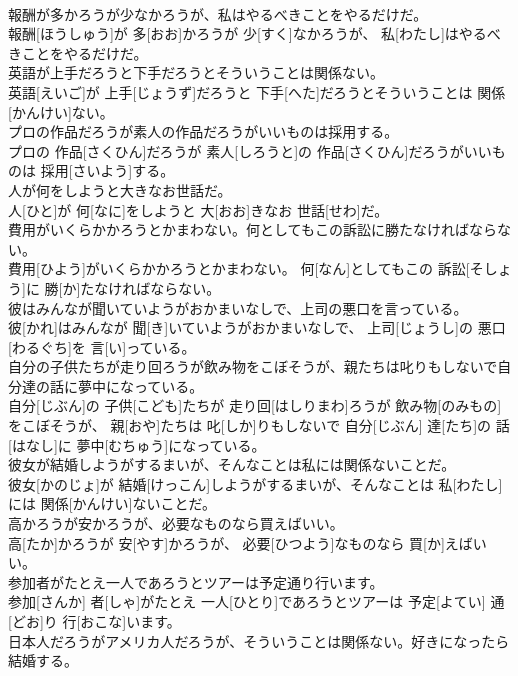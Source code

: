 \documentclass[8pt]{extreport}
\begin{document}
\begin{CJK}{UTF8}{min}
\\	報酬が多かろうが少なかろうが、私はやるべきことをやるだけだ。	
\\	報酬[ほうしゅう]が 多[おお]かろうが 少[すく]なかろうが、 私[わたし]はやるべきことをやるだけだ。
\\	英語が上手だろうと下手だろうとそういうことは関係ない。	
\\	英語[えいご]が 上手[じょうず]だろうと 下手[へた]だろうとそういうことは 関係[かんけい]ない。
\\	プロの作品だろうが素人の作品だろうがいいものは採用する。	
\\	プロの 作品[さくひん]だろうが 素人[しろうと]の 作品[さくひん]だろうがいいものは 採用[さいよう]する。
\\	人が何をしようと大きなお世話だ。	
\\	人[ひと]が 何[なに]をしようと 大[おお]きなお 世話[せわ]だ。
\\	費用がいくらかかろうとかまわない。何としてもこの訴訟に勝たなければならない。	
\\	費用[ひよう]がいくらかかろうとかまわない。 何[なん]としてもこの 訴訟[そしょう]に 勝[か]たなければならない。
\\	彼はみんなが聞いていようがおかまいなしで、上司の悪口を言っている。	
\\	彼[かれ]はみんなが 聞[き]いていようがおかまいなしで、 上司[じょうし]の 悪口[わるぐち]を 言[い]っている。
\\	自分の子供たちが走り回ろうが飲み物をこぼそうが、親たちは叱りもしないで自分達の話に夢中になっている。	
\\	自分[じぶん]の 子供[こども]たちが 走り回[はしりまわ]ろうが 飲み物[のみもの]をこぼそうが、 親[おや]たちは 叱[しか]りもしないで 自分[じぶん] 達[たち]の 話[はなし]に 夢中[むちゅう]になっている。
\\	彼女が結婚しようがするまいが、そんなことは私には関係ないことだ。	
\\	彼女[かのじょ]が 結婚[けっこん]しようがするまいが、そんなことは 私[わたし]には 関係[かんけい]ないことだ。
\\	高かろうが安かろうが、必要なものなら買えばいい。	
\\	高[たか]かろうが 安[やす]かろうが、 必要[ひつよう]なものなら 買[か]えばいい。
\\	参加者がたとえ一人であろうとツアーは予定通り行います。	
\\	参加[さんか] 者[しゃ]がたとえ 一人[ひとり]であろうとツアーは 予定[よてい] 通[どお]り 行[おこな]います。
\\	日本人だろうがアメリカ人だろうが、そういうことは関係ない。好きになったら結婚する。	

\end{CJK}
\end{document}
